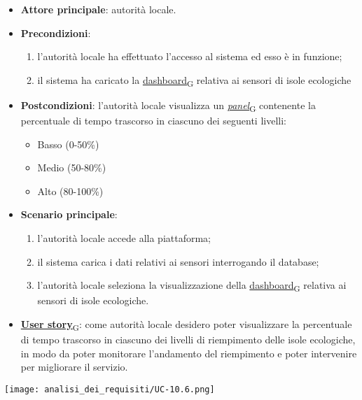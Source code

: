 \begin{itemize}
	\item \textbf{Attore principale}: autorità locale.
	\item \textbf{Precondizioni}:
	      \begin{enumerate}
		      \item l'autorità locale ha effettuato l'accesso al sistema ed esso è in funzione;
		      \item il sistema ha caricato la \href{https://7last.github.io/docs/rtb/documentazione-interna/glossario\#dashboard}{dashboard\textsubscript{G}} relativa ai sensori di isole ecologiche
	      \end{enumerate}
	\item \textbf{Postcondizioni}: l'autorità locale visualizza un \href{https://7last.github.io/docs/rtb/documentazione-interna/glossario\#panel}{\textit{panel}\textsubscript{G}} contenente la percentuale di tempo trascorso in ciascuno dei seguenti livelli:
	      \begin{itemize}
		      \item Basso (0-50\%)
		      \item Medio (50-80\%)
		      \item Alto (80-100\%)
	      \end{itemize}
\newpage
	\item \textbf{Scenario principale}:
	      \begin{enumerate}
		      \item l'autorità locale accede alla piattaforma;
		      \item il sistema carica i dati relativi ai sensori interrogando il database;
		      \item l'autorità locale seleziona la visualizzazione della \href{https://7last.github.io/docs/rtb/documentazione-interna/glossario\#dashboard}{dashboard\textsubscript{G}} relativa ai sensori di isole ecologiche.
	      \end{enumerate}
	\item \href{https://7last.github.io/docs/rtb/documentazione-interna/glossario\#user-story}{\textbf{User story}\textsubscript{G}}:
	      come autorità locale desidero poter visualizzare la percentuale di tempo trascorso in ciascuno dei livelli di riempimento delle isole ecologiche,
	      in modo da poter monitorare l'andamento del riempimento e poter intervenire per migliorare il servizio.
\end{itemize}
\begin{center}
	\texttt{[image: analisi\_dei\_requisiti/UC-10.6.png]}
\end{center}

